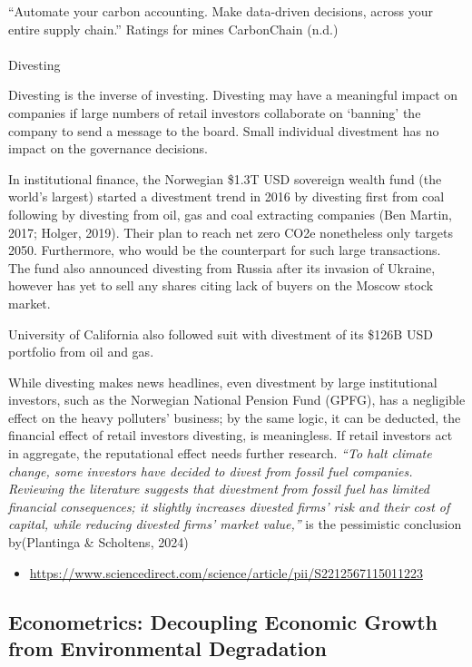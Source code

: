 \documentclass[
  letterpaper,
  DIV=11,
  numbers=noendperiod]{scrartcl}
\makeatletter
\let\oldparagraph\paragraph
\renewcommand{\paragraph}{
    \@ifstar
      \xxxParagraphStar
      \xxxParagraphNoStar
  }
\newcommand{\xxxParagraphStar}[1]{\oldparagraph*{#1}\mbox{}}
\newcommand{\xxxParagraphNoStar}[1]{\oldparagraph{#1}\mbox{}}
\providecommand{\tightlist}{%
  \setlength{\itemsep}{0pt}\setlength{\parskip}{0pt}}\usepackage{longtable,booktabs,array}
\makeatother
\begin{document}
``Automate your carbon accounting. Make data-driven decisions, across
your entire supply chain.'' Ratings for mines CarbonChain (n.d.)

\paragraph{Divesting}\label{divesting}

Divesting is the inverse of investing. Divesting may have a meaningful
impact on companies if large numbers of retail investors collaborate on
`banning' the company to send a message to the board. Small individual
divestment has no impact on the governance decisions.

In institutional finance, the Norwegian \$1.3T USD sovereign wealth fund
(the world's largest) started a divestment trend in 2016 by divesting
first from coal following by divesting from oil, gas and coal extracting
companies (Ben Martin, 2017; Holger, 2019). Their plan to reach net zero
CO2e nonetheless only targets 2050. Furthermore, who would be the
counterpart for such large transactions. The fund also announced
divesting from Russia after its invasion of Ukraine, however has yet to
sell any shares citing lack of buyers on the Moscow stock market.

University of California also followed suit with divestment of its
\$126B USD portfolio from oil and gas.

While divesting makes news headlines, even divestment by large
institutional investors, such as the Norwegian National Pension Fund
(GPFG), has a negligible effect on the heavy polluters' business; by the
same logic, it can be deducted, the financial effect of retail investors
divesting, is meaningless. If retail investors act in aggregate, the
reputational effect needs further research. \emph{``To halt climate
change, some investors have decided to divest from fossil fuel
companies. Reviewing the literature suggests that divestment from fossil
fuel has limited financial consequences; it slightly increases divested
firms' risk and their cost of capital, while reducing divested firms'
market value,''} is the pessimistic conclusion by(Plantinga \&
Scholtens, 2024)

\begin{itemize}
\tightlist
\item
  \url{https://www.sciencedirect.com/science/article/pii/S2212567115011223}
\end{itemize}

\subsection{Econometrics: Decoupling Economic Growth from Environmental
Degradation}\label{econometrics-decoupling-economic-growth-from-environmental-degradation}
\end{document}
